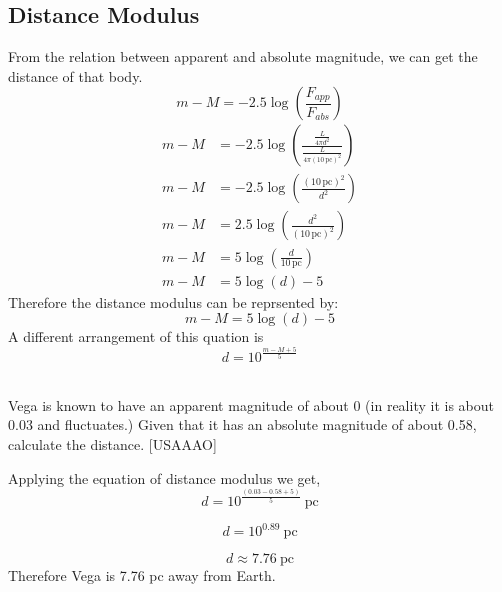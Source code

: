 \documentclass{article}
\begin{document}
\subsection{Distance Modulus}
From the relation between apparent and absolute magnitude, we can get the distance of that body.
$$m-M=-2.5\log \left( \frac{F_{app}}{F_{abs}} \right)$$
\begin{align*}
m - M &= -2.5 \log \left( \frac{\tfrac{L}{4\pi d^2}}{\tfrac{L}{4\pi (10 \, \text{pc})^2}} \right) \\
m - M &= -2.5 \log \left( \frac{(10 \, \text{pc})^2}{d^2} \right) \\[6pt]
m - M &= 2.5 \log \left( \frac{d^2}{(10 \, \text{pc})^2} \right) \\[6pt]
m - M &= 5 \log \left( \frac{d}{10 \, \text{pc}} \right) \\
m - M &= 5 \log(d) - 5
\end{align*}
Therefore the distance modulus can be reprsented by:
$$\boxed{m-M=5\log(d)-5}$$
A different arrangement of this quation is 
\[
\boxed{d = 10^{\tfrac{m - M + 5}{5}}}
\]
\\[2EM]
\begin{tcolorbox}[colback=blue!5!white,
                  colframe=blue!75!black,
                  title=Problem 4]
Vega is known to have an apparent
 magnitude of about 0 (in reality it is about 0.03 and fluctuates.) Given that it has an absolute
 magnitude of about 0.58, calculate the distance.
 [USAAAO]
\end{tcolorbox}
\noindent
\begin{tcolorbox}[colback=blue!5!white,
                  colframe=blue!75!black,
                  title=Solution]
Applying the equation of distance modulus we get,
\\
\[
d = 10^{\frac{(0.03 - 0.58 + 5)}{5}} \ \text{pc}
\]

\[
d = 10^{0.89} \ \text{pc}
\]

\[
d \approx 7.76 \ \text{pc}
\]
Therefore Vega is 7.76 pc away from Earth.
\end{tcolorbox}
\end{document}
